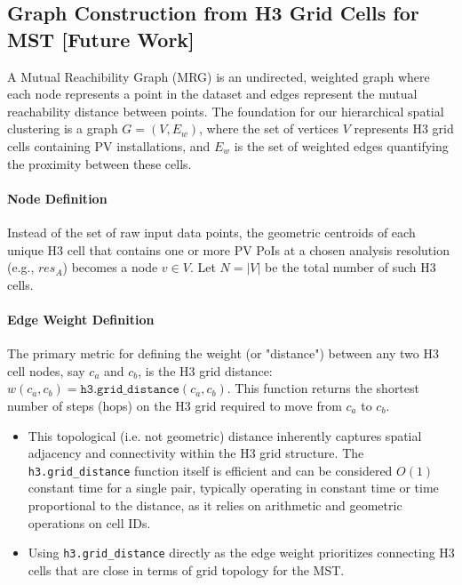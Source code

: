 \begin{multicols}{2}
\subsection{Graph Construction from H3 Grid Cells for MST [Future Work]}

A Mutual Reachibility Graph (MRG) is an undirected, weighted graph where each node represents a point in the dataset and edges represent the mutual reachability distance between points.
The foundation for our hierarchical spatial clustering is a graph $G=(V, E_w)$, where the set of vertices $V$ represents H3 grid cells containing PV installations, and $E_w$ is the set of weighted edges quantifying the proximity between these cells.

\paragraph{Node Definition}
Instead of the set of raw input data points, the geometric centroids of each unique H3 cell that contains one or more PV PoIs at a chosen analysis resolution (e.g., $res_A$) becomes a node $v \in V$. Let $N = |V|$ be the total number of such H3 cells.

\paragraph{Edge Weight Definition}
The primary metric for defining the weight (or "distance") between any two H3 cell nodes, say $c_a$ and $c_b$, is the H3 grid distance: $w(c_a, c_b) = \texttt{h3.grid\_distance}(c_a, c_b)$. 
This function returns the shortest number of steps (hops) on the H3 grid required to move from $c_a$ to $c_b$.
\begin{itemize}
    \item This topological (i.e. not geometric) distance inherently captures spatial adjacency and connectivity within the H3 grid structure. 
    The \texttt{h3.grid\_distance} function itself is efficient and can be considered $O(1)$ constant time for a single pair\cite{H3_Algorithm1}, typically operating in constant time or time proportional to the distance, as it relies on arithmetic and geometric operations on cell IDs.
    \item Using \texttt{h3.grid\_distance} directly as the edge weight prioritizes connecting H3 cells that are close in terms of grid topology for the MST.
\end{itemize}


\end{multicols}
